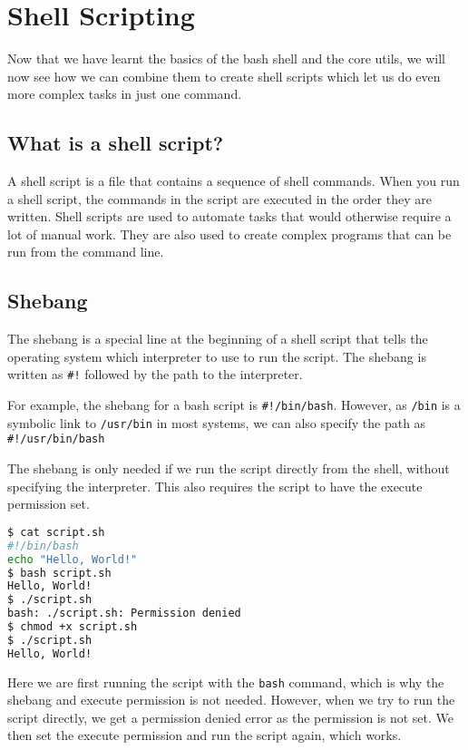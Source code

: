 \setchapterpreamble[u]{\margintoc}
\chapter{Shell Scripting}

Now that we have learnt the basics of the bash shell and the core utils, we will now see how we can combine them to create shell scripts which let us do even more complex tasks in just one command.

\section{What is a shell script?}

A shell script is a file that contains a sequence of shell commands. When you run a shell script, the commands in the script are executed in the order they are written. Shell scripts are used to automate tasks that would otherwise require a lot of manual work. They are also used to create complex programs that can be run from the command line.

\section{Shebang}

\begin{definition}[Shebang]
    The shebang is a special line at the beginning of a shell script that tells the operating system which interpreter to use to run the script. The shebang is written as \lstinline{#!} followed by the path to the interpreter.
\end{definition}

For example, the shebang for a bash script is \lstinline{#!/bin/bash}.
However, as \lstinline{/bin} is a symbolic link to \lstinline{/usr/bin} in most systems, we can also specify the path as \lstinline{#!/usr/bin/bash}

The shebang is only needed if we run the script directly from the shell, without specifying the interpreter.
This also requires the script to have the execute permission set.


\begin{lstlisting}[language=bash]
$ cat script.sh
#!/bin/bash
echo "Hello, World!"
$ bash script.sh
Hello, World!
$ ./script.sh
bash: ./script.sh: Permission denied
$ chmod +x script.sh
$ ./script.sh
Hello, World!
\end{lstlisting}

Here we are first running the script with the \lstinline{bash} command, which is why the shebang and execute permission is not needed. However, when we try to run the script directly, we get a permission denied error as the permission is not set. We then set the execute permission and run the script again, which works.

